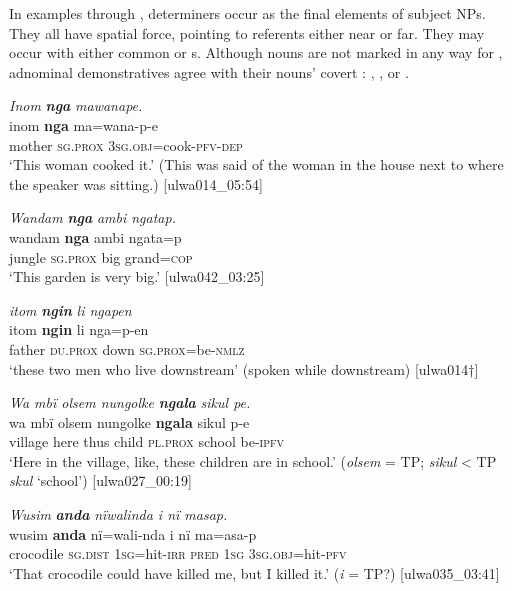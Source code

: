   In examples  through ,  determiners occur as the final elements of subject NPs. They all have spatial  force, pointing to referents either near or far. They may occur with either  common or s. Although nouns are not marked in any way for , adnominal demonstratives agree with their nouns’ covert : , , or .

\newpage

\ea%
    \label{ex:det:81}
          \textit{Inom} \textbf{\textit{nga}} \textit{mawanape.}\\
\gll    inom  \textbf{nga}    ma=wana-p-e\\
    mother  \textsc{sg.prox}  3\textsc{sg.obj}=cook-\textsc{pfv-dep}\\
\glt `This woman cooked it.’ (This was said of the woman in the house next to where the speaker was sitting.) [ulwa014\_05:54]
\z

\ea%
    \label{ex:det:82}

          \textit{Wandam} \textbf{\textit{nga}} \textit{ambi ngatap.}\\
\gll    wandam  \textbf{nga}    ambi  ngata=p\\
    jungle    \textsc{sg.prox}  big    grand=\textsc{cop}\\
\glt `This garden is very big.’ [ulwa042\_03:25]
\z

\ea%
    \label{ex:det:83}
          \textit{itom} \textbf{\textit{ngin}} \textit{li ngapen}\\
\gll    itom  \textbf{ngin}    li    nga=p-en\\
    father  \textsc{du.prox}  down  \textsc{sg.prox}=be\textsc{{}-nmlz}\\
\glt `these two men who live downstream’ (spoken while downstream) [ulwa014†]
\z

\ea%
    \label{ex:det:84}
          \textit{Wa mbï olsem nungolke} \textbf{\textit{ngala}} \textit{sikul pe.}\\
\gll    wa    mbï  olsem  nungolke  \textbf{ngala}    sikul  p-e\\
    village  here  thus  child    \textsc{pl.prox}  school  be\textsc{{}-ipfv}\\
\glt `Here in the village, like, these children are in school.’ (\textit{olsem} = TP; \textit{sikul} < TP \textit{skul} ‘school’) [ulwa027\_00:19]
\z

\ea%
    \label{ex:det:85}
          \textit{Wusim} \textbf{\textit{anda}} \textit{nïwalinda i nï masap.}\\
\gll    wusim    \textbf{anda}    nï=wali-nda  i    nï    ma=asa-p\\
    crocodile  \textsc{sg.dist}  \textsc{1sg}=hit-\textsc{irr}  \textsc{pred}  \textsc{1sg}  \textsc{3sg.obj=}hit-\textsc{pfv}\\
\glt `That crocodile could have killed me, but I killed it.’ (\textit{i} = TP?) [ulwa035\_03:41]
\z

